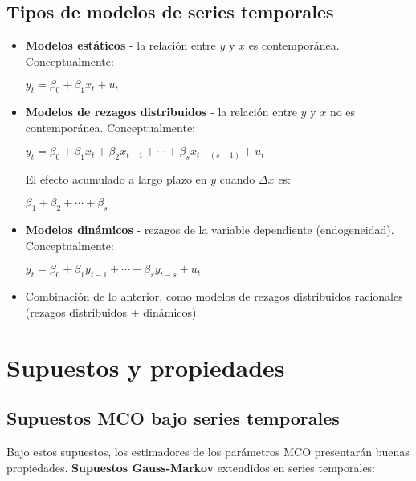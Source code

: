 \documentclass[10pt, a4paper, landscape]{article}
\begin{document}
\begin{multicols}{3}
\subsection*{Tipos de modelos de series temporales}

\begin{itemize}[leftmargin=*]
	\item \textbf{Modelos estáticos} - la relación entre \( y \) y \( x \) es contemporánea. Conceptualmente:
	\begin{center}
		\( y_{t} = \beta_{0} + \beta_{1} x_{t} + u_{t} \)
	\end{center}
	\item \textbf{Modelos de rezagos distribuidos} - la relación entre \( y \) y \( x \) no es contemporánea. Conceptualmente:
	\begin{center}
		\( y_{t} = \beta_{0} + \beta_{1} x_{t} + \beta_{2} x_{t - 1} + \cdots + \beta_{s} x_{t - (s - 1)} + u_{t} \)
	\end{center}
	El efecto acumulado a largo plazo en \( y \) cuando \( \Delta x \) es:
	\begin{center}
		\( \beta_{1} + \beta_{2} + \cdots + \beta_{s} \)
	\end{center}
	\item \textbf{Modelos dinámicos} - rezagos de la variable dependiente (endogeneidad). Conceptualmente:
	\begin{center}
		\( y_{t} = \beta_{0} + \beta_{1} y_{t - 1} + \cdots + \beta_{s} y_{t - s} + u_{t} \)
	\end{center}
	\item Combinación de lo anterior, como modelos de rezagos distribuidos racionales (rezagos distribuidos + dinámicos).
\end{itemize}

\columnbreak

\section*{Supuestos y propiedades}

\subsection*{Supuestos MCO bajo series temporales}

Bajo estos supuestos, los estimadores de los parámetros MCO presentarán buenas propiedades. \textbf{Supuestos Gauss-Markov} extendidos en series temporales:


\end{multicols}
\end{document}
